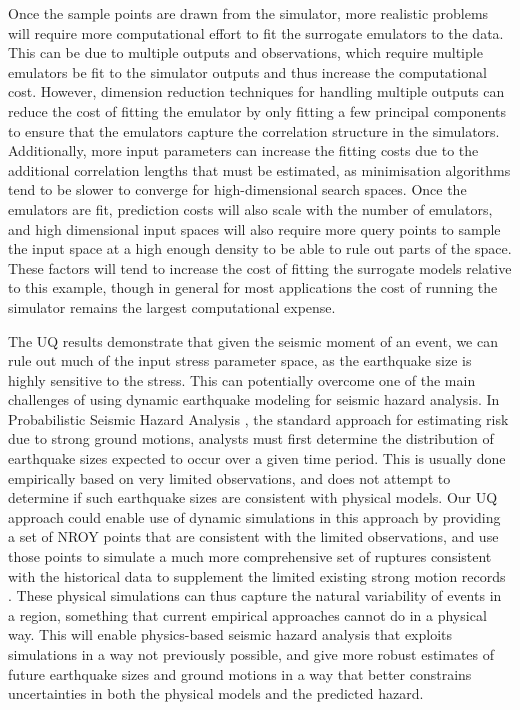 \documentclass[openacc]{rstransa}%
\begin{document}
Once the sample points are drawn from the simulator, more realistic problems
will require more computational effort to fit the surrogate emulators to
the data. This can be due to multiple outputs and observations, which
require multiple emulators be fit to the simulator outputs and thus
increase the computational cost. However, dimension reduction techniques
\cite{dimreduction} for handling multiple outputs can reduce the cost
of fitting the emulator by only fitting a few principal components to ensure
that the emulators capture the correlation structure in the simulators.
Additionally, more input parameters can increase the fitting costs due to
the additional correlation lengths that must be estimated, as minimisation
algorithms tend to be slower to converge for high-dimensional search
spaces.
Once the emulators are fit, prediction costs will also scale with the
number of emulators, and high dimensional input spaces will also require more
query points to sample the input space at a high enough density to
be able to rule out parts of the space.
These factors will tend to increase the cost of fitting the surrogate models
relative to this example, though in general for most applications the cost
of running the simulator remains the largest computational expense.

The UQ results demonstrate that given the seismic moment of an event, we can rule out
much of the input stress parameter space, as the earthquake size is highly sensitive to
the stress. This can potentially overcome one of the main challenges of using dynamic
earthquake modeling for seismic hazard analysis. In Probabilistic Seismic Hazard Analysis \cite{psha},
the standard approach for estimating risk due to strong ground motions, analysts must
first determine the distribution of earthquake sizes expected to occur over a given time period.
This is usually done empirically based on very limited observations, and does not attempt
to determine if such earthquake sizes are consistent with physical models.
Our UQ approach could enable use of dynamic simulations in this approach by providing a set
of NROY points that are consistent with the limited observations, and use those points to
simulate a much more comprehensive set of ruptures consistent with the historical data
to supplement the limited existing strong motion records \cite{gmpe}.
These physical simulations can thus capture the natural variability of events in a region,
something that current empirical approaches cannot do in a physical way.
This will enable
physics-based seismic hazard analysis that exploits simulations in a way not previously
possible, and give more robust estimates of future earthquake sizes and ground motions
in a way that better constrains uncertainties in both the physical models and the
predicted hazard.
\end{document}

